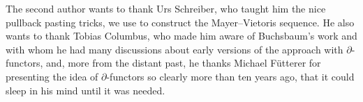 
The second author wants to thank Urs Schreiber, who taught him the nice pullback pasting tricks, we use to construct the Mayer--Vietoris sequence.
He also wants to thank Tobias Columbus, who made him aware of Buchsbaum's work and with whom he had many discussions about early versions of the approach with $\partial$-functors,
and, more from the distant past, he thanks Michael Fütterer for presenting the idea of $\partial$-functors so clearly more than ten years ago,
that it could sleep in his mind until it was needed.
